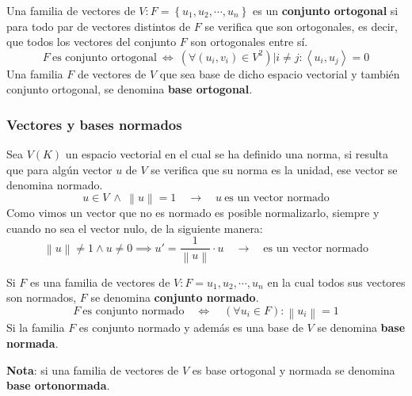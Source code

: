 Una familia de vectores de \(V:F=\left\{u_1,u_2,\cdots, u_n\right\}\) es un \textbf{conjunto ortogonal} si para todo par de vectores distintos de \(F\) se verifica que son ortogonales, es decir, que todos los vectores del conjunto \(F\) son ortogonales entre sí.
\[
F ~ \text{es conjunto ortogonal} ~ \Longleftrightarrow ~ \left(\forall (u_i,v_i)\in V^2\right) | i \neq j : \left\langle u_i, u_j\right\rangle = 0 
\]
Una familia \(F\) de vectores de \(V\) que sea base de dicho espacio vectorial y también conjunto ortogonal, se denomina \textbf{base ortogonal}.

\subsubsection{Vectores y bases normados}

Sea \(V(K)\) un espacio vectorial en el cual se ha definido una norma, si resulta que para algún vector \(u\) de \(V\) se verifica que su norma es la unidad, ese vector se denomina normado.
\[
  u \in V ~ \land ~ \left\lVert u\right\rVert = 1 \quad \rightarrow \quad u~\text{es un vector normado}
\]
Como vimos un vector que no es normado es posible normalizarlo, siempre y cuando no sea el vector nulo, de la siguiente manera:
\[
  \left\lVert u\right\rVert \neq 1 \land u \neq 0 \implies u' = \frac{1}{\left\lVert u\right\rVert} \cdot u \quad \rightarrow \quad \text{es un vector normado}
\]

Si \(F\) es una familia de vectores de \(V:F={u_1,u_2,\cdots,u_n}\) en la cual todos sus vectores son normados, \(F\) se denomina \textbf{conjunto normado}.
\[
  F ~ \text{es conjunto normado} \quad \Longleftrightarrow \quad \left(\forall u_i \in F\right): \left\lVert u_i\right\rVert = 1 
\]
Si la familia \(F\) es conjunto normado y además es una base de \(V\) se denomina \textbf{base normada}.

\textbf{Nota}: si una familia de vectores de \(V\) es base ortogonal y normada se denomina \textbf{base ortonormada}.
